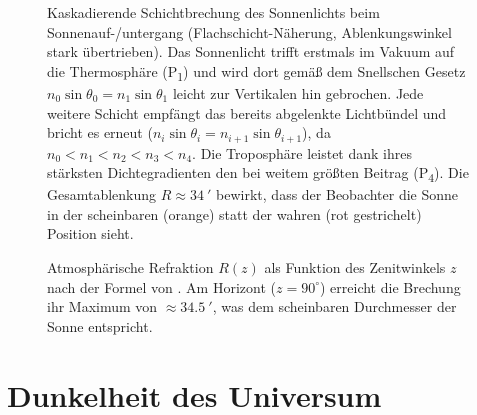 ﻿\documentclass[12pt,a4paper]{article}
\begin{document}
\begin{figure}[p]
\begin{tikzpicture}[scale=1.35, >=Stealth, font=\small]
\end{tikzpicture}
\caption{%
  Kaskadierende Schichtbrechung des Sonnenlichts beim Sonnenauf-/untergang
  (Flachschicht-Näherung, Ablenkungswinkel stark übertrieben).
  Das Sonnenlicht trifft erstmals im Vakuum auf die Thermosphäre (P\textsubscript{1})
  und wird dort gemäß dem Snellschen Gesetz $n_0\sin\theta_0 = n_1\sin\theta_1$
  leicht zur Vertikalen hin gebrochen.
  Jede weitere Schicht empfängt das bereits abgelenkte Lichtbündel
  und bricht es erneut ($n_i\sin\theta_i = n_{i+1}\sin\theta_{i+1}$),
  da $n_0 < n_1 < n_2 < n_3 < n_4$.
  Die Troposphäre leistet dank ihres stärksten Dichtegradienten
  den bei weitem größten Beitrag (P\textsubscript{4}).
  Die Gesamtablenkung $R \approx \SI{34}{\arcminute}$ bewirkt,
  dass der Beobachter die Sonne in der scheinbaren (orange)
  statt der wahren (rot gestrichelt) Position sieht.%
}
\label{fig:refraktion}
\end{figure}

\begin{figure}[htbp]
\centering
{}
\caption{Atmosphärische Refraktion $R(z)$ als Funktion des Zenitwinkels $z$
         nach der Formel von \citet{Meeus1991}.
         Am Horizont ($z = 90^{\circ}$) erreicht die Brechung ihr Maximum
         von $\approx \SI{34.5}{\arcminute}$,
         was dem scheinbaren Durchmesser der Sonne entspricht.}
\label{fig:refraktion_kurve}
\end{figure}

\section{Dunkelheit des Universum}
\label{sec:olbers}
\end{document}
